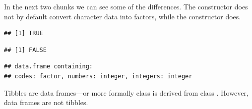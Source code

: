 \documentclass[krantz2]{krantz}\usepackage{knitr}%
\begin{document}
In the next two chunks we can see some of the differences. The  constructor does not by default convert character data into factors, while the  constructor does.

\begin{knitrout}\footnotesize
{}\color{fgcolor}\begin{kframe}
\begin{alltt}
 \hlkwb{<-} \hlstd{(} \hlstd{=} \hlstd{(}\hlstd{,} \hlstd{,} \hlstd{),}  \hlstd{=} \hlopt{:}\hlstd{,}  \hlstd{=} \hlopt{:}\hlstd{)}
\end{alltt}
\begin{verbatim}
## [1] TRUE
\end{verbatim}
\begin{alltt}
\end{alltt}
\begin{verbatim}
## [1] FALSE
\end{verbatim}
\begin{alltt}
\end{alltt}
\begin{verbatim}
## data.frame containing:
## codes: factor, numbers: integer, integers: integer
\end{verbatim}
\end{kframe}
\end{knitrout}

Tibbles are data frames---or more formally class  is derived from class . However, data frames are not tibbles.
\end{document}
